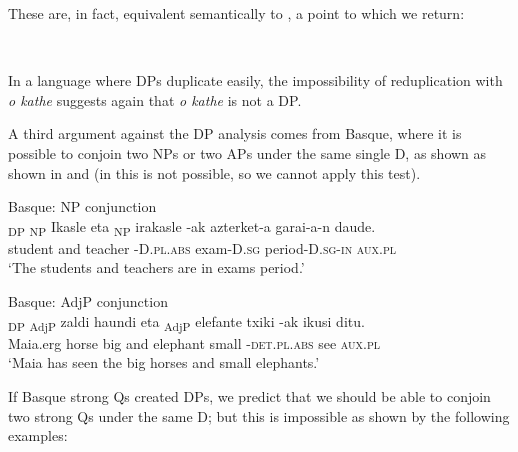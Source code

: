 \documentclass[output=paper,
modfonts
]{langscibook}
\begin{document}
These are, in fact, equivalent semantically to , a point to which we return:

\ea\label{ex:etxeberria:30} \\
\z
\z

In a language where DPs duplicate easily, the impossibility of reduplication with \textit{o kathe} suggests again that \textit{o kathe} is not a DP.

A third argument against the DP analysis comes from Basque, where it is possible to conjoin two NPs or two APs under the same single D, as shown as shown in  and  (in  this is not possible, so we cannot apply this test).\newpage 

\ea\label{ex:etxeberria:31}
	Basque: {NP conjunction}\\
	\gll {\ob}\textsubscript{\textnormal{DP}} {\ob}\textsubscript{\textnormal{NP}} {Ikasle}{\cb} {eta} {\ob}\textsubscript{\textnormal{NP}} {irakasle}{\cb} -{ak}{\cb} {azterket-a} {garai-a-n} {daude}.\\
	{\ob} {\ob} student{\cb} and {\ob} teacher{\cb} -D.\textsc{pl.abs}{\cb} exam-D.\textsc{sg} period-D.\textsc{sg-in} \textsc{aux.pl}\\
	\glt `The students and teachers are in exams period.'
\z

\ea\label{ex:etxeberria:32}
	Basque: {AdjP conjunction}\\
 {\ob}\textsubscript{\textnormal{DP}} {\ob}\textsubscript{\textnormal{AdjP}} {zaldi} {haundi}{\cb} {eta} {\ob}\textsubscript{\textnormal{AdjP}} {elefante} {txiki}{\cb} -{ak}{\cb} {ikusi} {ditu}.\\
Maia.erg {\ob} {\ob} horse big{\cb} and {\ob} elephant small{\cb} -\textsc{det.pl.abs}{\cb} see \textsc{aux.pl}\\
\glt `Maia has seen the big horses and small elephants.'
\z

If Basque strong Qs created DPs, we  predict that we should be able to conjoin two strong Qs under the same D; but this is impossible as shown by the following examples:
\end{document}
